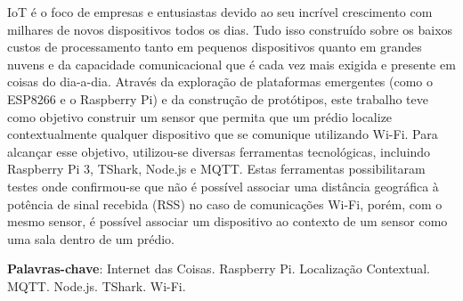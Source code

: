 \setlength{\absparsep}{18pt} %
\begin{resumo}

	IoT é o foco de empresas e entusiastas devido ao seu incrível crescimento com
	milhares de novos dispositivos todos os dias. Tudo isso construído sobre os
	baixos custos de processamento tanto em pequenos dispositivos quanto em
	grandes nuvens e da capacidade comunicacional que é cada vez mais exigida e
	presente em coisas do dia-a-dia.
	Através da exploração de plataformas emergentes (como o ESP8266 e o Raspberry
	Pi) e da construção de protótipos, este trabalho teve como objetivo
	construir um sensor que permita que um prédio localize contextualmente
	qualquer dispositivo que se comunique utilizando Wi-Fi. Para
	alcançar esse objetivo, utilizou-se diversas ferramentas tecnológicas,
	incluindo Raspberry Pi 3, TShark, Node.js e MQTT. Estas ferramentas
	possibilitaram testes onde confirmou-se que não é possível associar uma
	distância geográfica à potência de sinal recebida (RSS) no caso de
	comunicações Wi-Fi, porém, com o mesmo sensor, é possível associar um
	dispositivo ao contexto de um sensor como uma sala dentro de um prédio.

	\textbf{Palavras-chave}: Internet das Coisas. Raspberry Pi. Localização Contextual. MQTT. Node.js. TShark. Wi-Fi.
\end{resumo}
